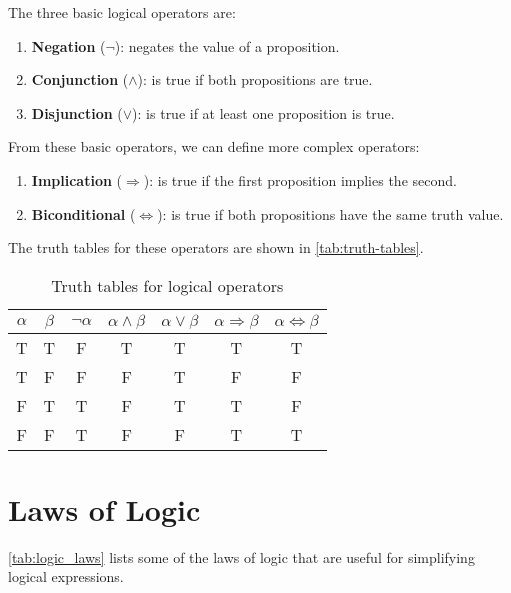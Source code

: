 \documentclass[oneside,11pt,dvipsnames]{book}
\renewcommand{\implies}{\Rightarrow}
\begin{document}
The three basic logical operators are:
\begin{enumerate}
    \item \textbf{Negation} ($\neg$): negates the value of a proposition. 
    \item \textbf{Conjunction} ($\wedge$): is true if both propositions are true.
    \item \textbf{Disjunction} ($\vee$): is true if at least one proposition is true. 
\end{enumerate}

From these basic operators, we can define more complex operators:

\begin{enumerate}
\item \textbf{Implication} ($\Rightarrow$): is true if the first proposition implies the second. 
\item \textbf{Biconditional} ($\Leftrightarrow$): is true if both propositions have the same truth value. 
\end{enumerate}

The truth tables for these operators are shown in \autoref{tab:truth-tables}.

\begin{table}
    \caption{Truth tables for logical operators}\label{tab:truth-tables}
    \centering
\begin{tabular}{c|c|c|c|c|c|c}
    $\alpha$ & $\beta$ & $\neg \alpha$ & $\alpha \land \beta$ & $\alpha \lor \beta$ & $\alpha \implies \beta$ & $\alpha \Leftrightarrow \beta$ \\
    \midrule
    T & T & F & T & T & T & T \\
    T & F & F & F & T & F & F \\
    F & T & T & F & T & T & F \\
    F & F & T & F & F & T & T
\end{tabular}
\end{table}
\section{Laws of Logic}\label{sec:logic-laws}
\autoref{tab:logic_laws} lists some of the laws of logic that are useful for  simplifying logical expressions.
\end{document}
